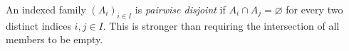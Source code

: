 
An indexed family $(A_i)_{i\in I}$ is \emph{pairwise disjoint} if $A_i\cap A_j=\varnothing$ for every two distinct indices $i,j\in I$. This is stronger than requiring the intersection of all members to be empty.
